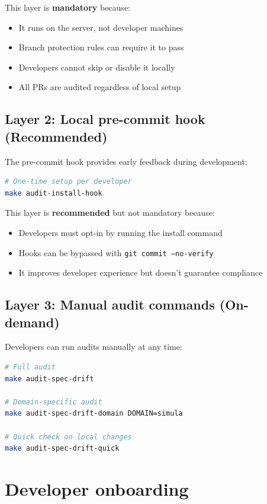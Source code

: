 \documentclass[11pt,a4paper,twoside]{report}
\begin{document}
This layer is \textbf{mandatory} because:
\begin{itemize}
\item It runs on the server, not developer machines
\item Branch protection rules can require it to pass
\item Developers cannot skip or disable it locally
\item All PRs are audited regardless of local setup
\end{itemize}

\subsection{Layer 2: Local pre-commit hook (Recommended)}

The pre-commit hook provides early feedback during development:

\begin{lstlisting}[language=bash,caption=Pre-commit hook installation]
# One-time setup per developer
make audit-install-hook
\end{lstlisting}

This layer is \textbf{recommended} but not mandatory because:
\begin{itemize}
\item Developers must opt-in by running the install command
\item Hooks can be bypassed with \texttt{git commit --no-verify}
\item It improves developer experience but doesn't guarantee compliance
\end{itemize}

\subsection{Layer 3: Manual audit commands (On-demand)}

Developers can run audits manually at any time:

\begin{lstlisting}[language=bash,caption=Manual audit commands]
# Full audit
make audit-spec-drift

# Domain-specific audit
make audit-spec-drift-domain DOMAIN=simula

# Quick check on local changes
make audit-spec-drift-quick
\end{lstlisting}

\section{Developer onboarding}
\label{sec:onboarding}
\end{document}
